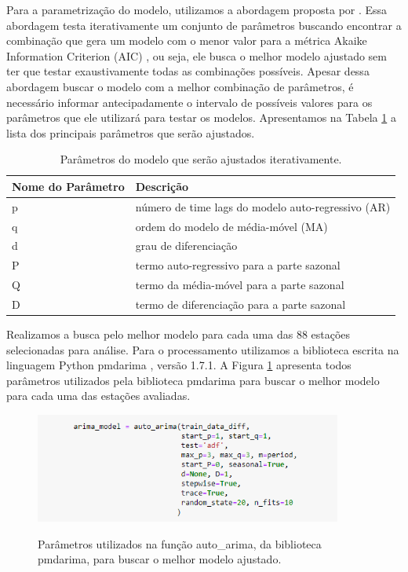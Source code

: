 Para a parametrização do modelo, utilizamos a abordagem proposta por . Essa abordagem testa iterativamente um conjunto de parâmetros buscando encontrar a combinação que gera um modelo com o menor valor para a métrica Akaike Information Criterion (AIC) \cite{sakamoto1986akaike}, ou seja, ele busca o melhor modelo ajustado sem ter que testar exaustivamente todas as combinações possíveis. Apesar dessa abordagem buscar o modelo com a melhor combinação de parâmetros, é necessário informar antecipadamente o intervalo de possíveis valores para os parâmetros que ele utilizará para testar os modelos. Apresentamos na Tabela \ref{tab:lista_parametros_arima} a lista dos principais parâmetros que serão ajustados.

\begin{table}[H]
\caption{Parâmetros do modelo que serão ajustados iterativamente.}
\label{tab:lista_parametros_arima}
\begin{adjustbox}{width=\textwidth}
\begin{tabular}{|l|l|}
\hline
\textbf{Nome do Parâmetro} & \textbf{Descrição}\\
\hline
p  & número de time lags do modelo auto-regressivo (AR) \\
\hline
q & ordem do modelo de média-móvel (MA) \\
\hline
d & grau de diferenciação \\
\hline
P & termo auto-regressivo para a parte sazonal \\
\hline
Q & termo da média-móvel para a parte sazonal \\
\hline
D & termo de diferenciação para a parte sazonal \\
\hline
\end{tabular}
\end{adjustbox}
\end{table}

Realizamos a busca pelo melhor modelo para cada uma das 88 estações selecionadas para análise. Para o processamento utilizamos a biblioteca escrita na linguagem Python pmdarima \cite{smith2017pmdarima}, versão 1.7.1. A Figura \ref{fig:parametros_auto_arima} apresenta todos parâmetros utilizados pela biblioteca pmdarima para buscar o melhor modelo para cada uma das estações avaliadas. 

\begin{figure}[H]
\centering
\caption{Parâmetros utilizados na função auto\_arima, da biblioteca pmdarima, para buscar o melhor modelo ajustado.}
\includegraphics[width=0.9\textwidth]{figuras/parametros_autoarima.png}
\label{fig:parametros_auto_arima}
\end{figure}

